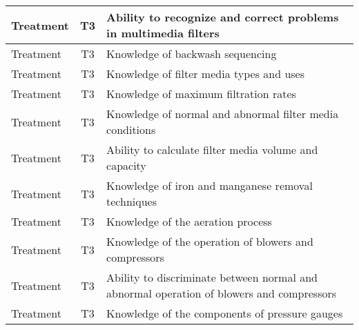 \documentclass{article}
\begin{document}
\begin{table}[]
\begin{tabular}{|l|c|l|}
Treatment                              & T3             & Ability to recognize   and correct problems in multimedia filters                                                                 \\ \hline
Treatment                              & T3             & Knowledge of backwash   sequencing                                                                                                \\ \hline
Treatment                              & T3             & Knowledge of filter   media types and uses                                                                                        \\ \hline
Treatment                              & T3             & Knowledge of maximum   filtration rates                                                                                           \\ \hline
Treatment                              & T3             & Knowledge of normal   and abnormal filter media conditions                                                                        \\ \hline
Treatment                              & T3             & Ability to calculate   filter media volume and capacity                                                                           \\ \hline
Treatment                              & T3             & Knowledge of iron and   manganese removal techniques                                                                              \\ \hline
Treatment                              & T3             & Knowledge of the   aeration process                                                                                               \\ \hline
Treatment                              & T3             & Knowledge of the   operation of blowers and compressors                                                                           \\ \hline
Treatment                              & T3             & Ability to   discriminate between normal and abnormal operation of blowers and compressors                                        \\ \hline
Treatment                              & T3             & Knowledge of the   components of pressure gauges                                                                                  \\ \hline

\end{tabular}
\end{table}
\end{document}
